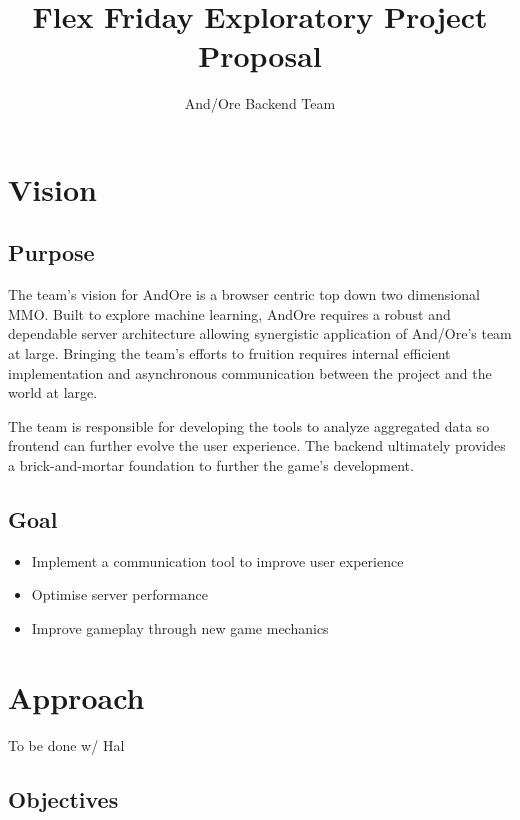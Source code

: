 \documentclass[11pt]{article}
\title{\textbf{{\color{blue}Flex Friday Exploratory Project Proposal}}}
\author{And/Ore Backend Team}
\date{}
\begin{document}
\maketitle

\section{{\color{blue}Vision}}

\subsection{{\color{blue}Purpose}}

\tab The team's vision for AndOre is a browser centric top down two dimensional MMO. Built to explore machine learning, AndOre requires a robust and dependable server architecture allowing synergistic application of And/Ore’s team at large. Bringing the team's efforts to fruition requires internal efficient implementation and asynchronous communication between the project and the world at large.
 
The team is responsible for developing the tools to analyze aggregated data so frontend can further evolve the user experience. The backend ultimately provides a brick-and-mortar foundation to further the game's development.

\subsection{{\color{blue}Goal}}

\begin{itemize}
\item Implement a communication tool to improve user experience
\item Optimise server performance
\item Improve gameplay through new game mechanics
\end{itemize}

\section{{\color{blue}Approach}}

To be done w/ Hal

\subsection{{\color{blue}Objectives}}
\end{document}
